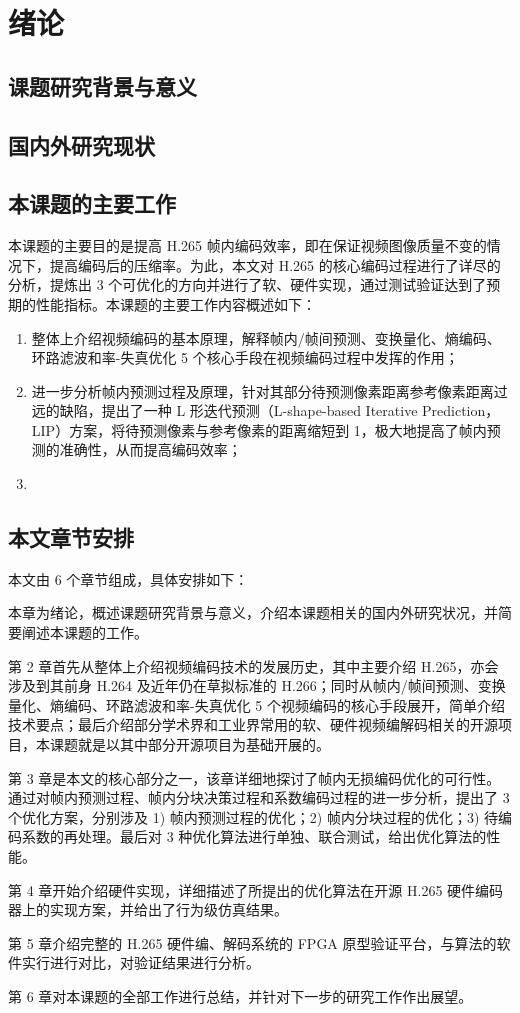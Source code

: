 \chapter{绪论}
\label{cha:c1}

\section{课题研究背景与意义}

\section{国内外研究现状}
\cite{SAP-SAP1}

\section{本课题的主要工作}
本课题的主要目的是提高 H.265 帧内编码效率，即在保证视频图像质量不变的情况下，提高编码后的压缩率。为此，本文对 H.265 的核心编码过程进行了详尽的分析，提炼出 3 个可优化的方向并进行了软、硬件实现，通过测试验证达到了预期的性能指标。本课题的主要工作内容概述如下：
\begin{enumerate}
    \item 整体上介绍视频编码的基本原理，解释帧内/帧间预测、变换量化、熵编码、环路滤波和率-失真优化 5 个核心手段在视频编码过程中发挥的作用；
    \item 进一步分析帧内预测过程及原理，针对其部分待预测像素距离参考像素距离过远的缺陷，提出了一种 L 形迭代预测（L-shape-based Iterative Prediction，LIP）方案，将待预测像素与参考像素的距离缩短到 1，极大地提高了帧内预测的准确性，从而提高编码效率；
    \item 
\end{enumerate}

\section{本文章节安排}
本文由 6 个章节组成，具体安排如下：

本章为绪论，概述课题研究背景与意义，介绍本课题相关的国内外研究状况，并简要阐述本课题的工作。

第 2 章首先从整体上介绍视频编码技术的发展历史，其中主要介绍 H.265，亦会涉及到其前身 H.264 及近年仍在草拟标准的 H.266；同时从帧内/帧间预测、变换量化、熵编码、环路滤波和率-失真优化 5 个视频编码的核心手段展开，简单介绍技术要点；最后介绍部分学术界和工业界常用的软、硬件视频编解码相关的开源项目，本课题就是以其中部分开源项目为基础开展的。

第 3 章是本文的核心部分之一，该章详细地探讨了帧内无损编码优化的可行性。通过对帧内预测过程、帧内分块决策过程和系数编码过程的进一步分析，提出了 3 个优化方案，分别涉及 1) 帧内预测过程的优化；2) 帧内分块过程的优化；3) 待编码系数的再处理。最后对 3 种优化算法进行单独、联合测试，给出优化算法的性能。

第 4 章开始介绍硬件实现，详细描述了所提出的优化算法在开源 H.265 硬件编码器上的实现方案，并给出了行为级仿真结果。

第 5 章介绍完整的 H.265 硬件编、解码系统的 FPGA 原型验证平台，与算法的软件实行进行对比，对验证结果进行分析。

第 6 章对本课题的全部工作进行总结，并针对下一步的研究工作作出展望。

